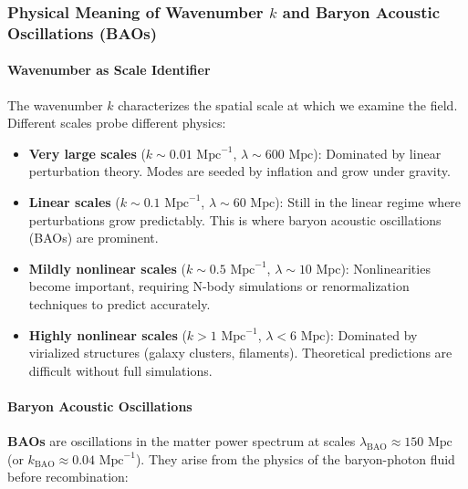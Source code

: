 \subsubsection{Physical Meaning of Wavenumber $k$ and Baryon Acoustic Oscillations (BAOs)}

\paragraph{Wavenumber as Scale Identifier}

The wavenumber $k$ characterizes the spatial scale at which we examine the field. Different scales probe different physics:

\begin{itemize}
    \item \textbf{Very large scales} ($k \sim 0.01 \text{ Mpc}^{-1}$, $\lambda \sim 600 \text{ Mpc}$): Dominated by linear perturbation theory. Modes are seeded by inflation and grow under gravity.
    
    \item \textbf{Linear scales} ($k \sim 0.1 \text{ Mpc}^{-1}$, $\lambda \sim 60 \text{ Mpc}$): Still in the linear regime where perturbations grow predictably. This is where baryon acoustic oscillations (BAOs) are prominent.
    
    \item \textbf{Mildly nonlinear scales} ($k \sim 0.5 \text{ Mpc}^{-1}$, $\lambda \sim 10 \text{ Mpc}$): Nonlinearities become important, requiring N-body simulations or renormalization techniques to predict accurately.
    
    \item \textbf{Highly nonlinear scales} ($k > 1 \text{ Mpc}^{-1}$, $\lambda < 6 \text{ Mpc}$): Dominated by virialized structures (galaxy clusters, filaments). Theoretical predictions are difficult without full simulations.
\end{itemize}

\paragraph{Baryon Acoustic Oscillations}

\textbf{BAOs} are oscillations in the matter power spectrum at scales $\lambda_{\text{BAO}} \approx 150 \text{ Mpc}$ (or $k_{\text{BAO}} \approx 0.04 \text{ Mpc}^{-1}$). They arise from the physics of the baryon-photon fluid before recombination:

